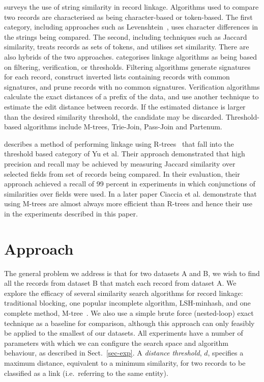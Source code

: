 \documentclass{llncs}
\begin{document}
\cite{Yu2016} surveys the use of string similarity in record linkage.
Algorithms used to compare two records are characterised as being
character-based or token-based. The first category, including approaches
such as Levenshtein~\cite{Levenshtein66}, uses character differences in
the strings being compared. The second, including techniques such as
Jaccard similarity, treats records as sets of tokens, and utilises set
similarity. There are also hybrids of the two approaches.
\cite{Yu2016} categorises linkage algorithms as being based on filtering,
verification, or thresholds.
Filtering algorithms generate signatures for each record, construct
inverted lists containing records with common signatures, and prune
records with no common signatures.
Verification algorithms calculate the exact distances of a prefix of the
data, and use another technique to estimate the edit distance between
records. If the estimated distance is larger than the desired similarity
threshold, the candidate may be discarded.
Threshold-based algorithms include M-trees, Trie-Join, Pass-Join and
Partenum.

\cite{Li2006} describes a method of performing linkage using R-trees~\cite{Hjaltason1998} that fall into the threshold based category of Yu et al. Their approach demonstrated that high precision and recall may be achieved by measuring Jaccard similarity over selected fields from set of records being compared. In their evaluation, their approach achieved a recall of 99 percent in experiments in which conjunctions of similarities over fields were used. In a later paper \cite{Ciaccia97indexingmetric}  Ciaccia et al. demonstrate that using M-trees are almost always more efficient than R-trees and hence their use in the experiments described in this paper.



\section{Approach}
\label{sec-approach}

The general problem we address is that for two datasets A and B, we wish
to find all the records from dataset B that match each record from dataset A.
We explore the efficacy of several similarity search algorithms for
record linkage: traditional blocking, one popular incomplete algorithm, LSH-minhash, and one complete
method, M-tree~\cite{paolociaccia2m}. We also use a simple brute force
(nested-loop) exact technique as a baseline for comparison, although
this approach can only feasibly be applied to the smallest of our
datasets. All experiments have a number of parameters with which we can
configure the search space and algorithm behaviour, as described in
Sect.~\ref{sec-exp}. A \emph{distance threshold}, $d$, specifies a
maximum distance, equivalent to a minimum similarity, for two records to
be classified as a link (i.e.\ referring to the same entity).
\end{document}
